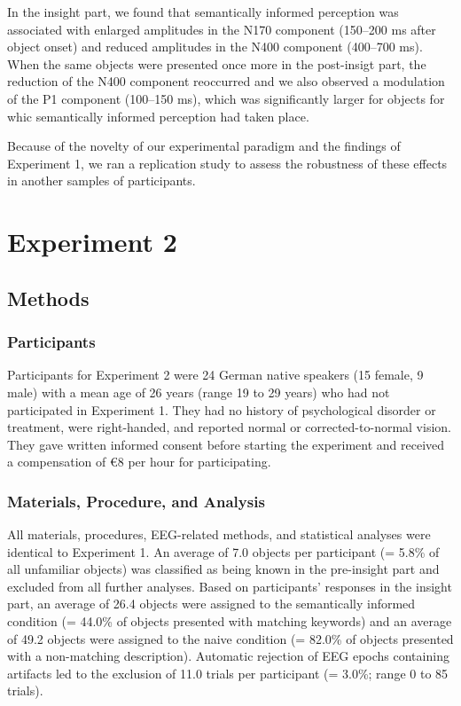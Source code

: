 \documentclass[
  english,
  man,12pt,twoside]{apa7}
\begin{document}
In the insight part, we found that semantically informed perception was associated with enlarged amplitudes in the N170 component (150--200 ms after object onset) and reduced amplitudes in the N400 component (400--700 ms). When the same objects were presented once more in the post-insigt part, the reduction of the N400 component reoccurred and we also observed a modulation of the P1 component (100--150 ms), which was significantly larger for objects for whic semantically informed perception had taken place.

Because of the novelty of our experimental paradigm and the findings of Experiment 1, we ran a replication study to assess the robustness of these effects in another samples of participants.

\hypertarget{experiment-2}{%
\section{Experiment 2}\label{experiment-2}}

\hypertarget{methods}{%
\subsection{Methods}\label{methods}}

\hypertarget{participants-1}{%
\subsubsection{Participants}\label{participants-1}}

Participants for Experiment 2 were 24 German native speakers (15 female, 9 male) with a mean age of 26 years (range 19 to 29 years) who had not participated in Experiment 1. They had no history of psychological disorder or treatment, were right-handed, and reported normal or corrected-to-normal vision. They gave written informed consent before starting the experiment and received a compensation of €8 per hour for participating.

\hypertarget{materials-procedure-and-analysis}{%
\subsubsection{Materials, Procedure, and Analysis}\label{materials-procedure-and-analysis}}

All materials, procedures, EEG-related methods, and statistical analyses were identical to Experiment 1. An average of 7.0 objects per participant (= 5.8\% of all unfamiliar objects) was classified as being known in the pre-insight part and excluded from all further analyses. Based on participants' responses in the insight part, an average of 26.4 objects were assigned to the semantically informed condition (= 44.0\% of objects presented with matching keywords) and an average of 49.2 objects were assigned to the naive condition (= 82.0\% of objects presented with a non-matching description). Automatic rejection of EEG epochs containing artifacts led to the exclusion of 11.0 trials per participant (= 3.0\%; range 0 to 85 trials).
\end{document}
